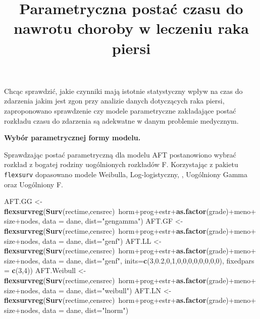 \documentclass[]{article}
\title{Parametryczna postać czasu do nawrotu choroby w leczeniu raka piersi}
\author{}
\date{}
\newenvironment{Shaded}{}{}
\newcommand{\KeywordTok}[1]{\textcolor[rgb]{0.00,0.44,0.13}{\textbf{{#1}}}}
\newcommand{\DataTypeTok}[1]{\textcolor[rgb]{0.56,0.13,0.00}{{#1}}}
\newcommand{\DecValTok}[1]{\textcolor[rgb]{0.25,0.63,0.44}{{#1}}}
\newcommand{\FloatTok}[1]{\textcolor[rgb]{0.25,0.63,0.44}{{#1}}}
\newcommand{\StringTok}[1]{\textcolor[rgb]{0.25,0.44,0.63}{{#1}}}
\newcommand{\NormalTok}[1]{{#1}}
\begin{document}
\maketitle


\thispagestyle{fancy}

Chcąc sprawdzić, jakie czynniki mają istotnie statystyczny wpływ na czas
do zdarzenia jakim jest zgon przy analizie danych dotyczących raka
piersi, zaproponowano sprawdzenie czy modele parametryczne zakładające
postać rozkładu czasu do zdarzenia są adekwatne w danym problemie
medycznym.

\textbf{Wybór parametrycznej formy modelu.}

Sprawdzając postać parametryczną dla modelu AFT postanowiono wybrać
rozkład z bogatej rodziny uogólnionych rozkładów F. Korzystając z
pakietu \texttt{flexsurv} dopasowano modele Weibulla, Log-logistyczny,
, Uogólniony Gamma oraz Uogólniony F.

\begin{Shaded}
\begin{Highlighting}[]
\NormalTok{AFT.GG <-}\StringTok{ }\KeywordTok{flexsurvreg}\NormalTok{(}\KeywordTok{Surv}\NormalTok{(rectime,censrec)~horm+prog+estr+}\KeywordTok{as.factor}\NormalTok{(grade)+meno+size+nodes, }
                             \DataTypeTok{data =} \NormalTok{dane, }\DataTypeTok{dist=}\StringTok{"gengamma"}\NormalTok{)}
\NormalTok{AFT.GF <-}\StringTok{ }\KeywordTok{flexsurvreg}\NormalTok{(}\KeywordTok{Surv}\NormalTok{(rectime,censrec)~horm+prog+estr+}\KeywordTok{as.factor}\NormalTok{(grade)+meno+size+nodes, }
                             \DataTypeTok{data =} \NormalTok{dane, }\DataTypeTok{dist=}\StringTok{"genf"}\NormalTok{)}
\NormalTok{AFT.LL <-}\StringTok{ }\KeywordTok{flexsurvreg}\NormalTok{(}\KeywordTok{Surv}\NormalTok{(rectime,censrec)~horm+prog+estr+}\KeywordTok{as.factor}\NormalTok{(grade)+meno+size+nodes, }
                             \DataTypeTok{data =} \NormalTok{dane, }\DataTypeTok{dist=}\StringTok{"genf"}\NormalTok{, }\DataTypeTok{inits=}\KeywordTok{c}\NormalTok{(}\DecValTok{3}\NormalTok{,}\FloatTok{0.2}\NormalTok{,}\DecValTok{0}\NormalTok{,}\DecValTok{1}\NormalTok{,}\DecValTok{0}\NormalTok{,}\DecValTok{0}\NormalTok{,}\DecValTok{0}\NormalTok{,}\DecValTok{0}\NormalTok{,}\DecValTok{0}\NormalTok{,}\DecValTok{0}\NormalTok{,}\DecValTok{0}\NormalTok{,}\DecValTok{0}\NormalTok{), }
                             \DataTypeTok{fixedpars =} \KeywordTok{c}\NormalTok{(}\DecValTok{3}\NormalTok{,}\DecValTok{4}\NormalTok{))}
\NormalTok{AFT.Weibull <-}\StringTok{ }\KeywordTok{flexsurvreg}\NormalTok{(}\KeywordTok{Surv}\NormalTok{(rectime,censrec)~horm+prog+estr+}\KeywordTok{as.factor}\NormalTok{(grade)+meno+}
\StringTok{                             }\NormalTok{size+nodes,}
                             \DataTypeTok{data =} \NormalTok{dane, }\DataTypeTok{dist=}\StringTok{"weibull"}\NormalTok{)}
\NormalTok{AFT.LN <-}\StringTok{ }\KeywordTok{flexsurvreg}\NormalTok{(}\KeywordTok{Surv}\NormalTok{(rectime,censrec)~horm+prog+estr+}\KeywordTok{as.factor}\NormalTok{(grade)+meno+size+nodes, }
                             \DataTypeTok{data =} \NormalTok{dane, }\DataTypeTok{dist=}\StringTok{"lnorm"}\NormalTok{)}
\end{Highlighting}
\end{Shaded}
\end{document}
